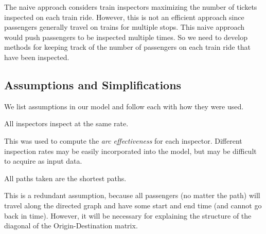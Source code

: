 \documentclass[11pt]{article}
\begin{document}
\par The naive approach considers train inspectors maximizing the number of tickets inspected on each train ride. However, this is not an efficient approach since passengers generally travel on trains for multiple stops. This naive approach would push passengers to be inspected multiple times. So we need to develop methods for keeping track of the number of passengers on each train ride that have been inspected.

\subsection{Assumptions and Simplifications}

We list assumptions in our model and follow each with how they were used.

\begin{assump}
All inspectors inspect at the same rate.
\end{assump}
This was used to compute the \textit{arc effectiveness} for each inspector. Different inspection rates may be easily incorporated into the model, but may be difficult to acquire as input data.

\begin{assump}
All paths taken are the shortest paths.
\end{assump}
This is a redundant assumption, because all passengers (no matter the path) will travel along the directed graph and have some start and end time (and cannot go back in time). However, it will be necessary for explaining the structure of the diagonal of the Origin-Destination matrix.
\end{document}
